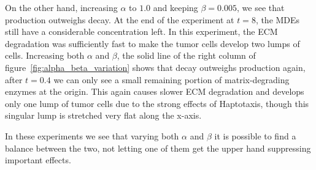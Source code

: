 On the other hand, increasing $\alpha$ to $1.0$ and keeping $\beta=0.005$, we see that production outweighs decay. At the end of the experiment at $t=8$, the MDEs still have a considerable concentration left. In this experiment, the ECM degradation was sufficiently fast to make the tumor cells develop two lumps of cells. Increasing both $\alpha$ and $\beta$, the solid line of the right column of figure~\ref{fig:alpha_beta_variation} shows that decay outweighs production again, after $t=0.4$ we can only see a small remaining portion of matrix-degrading enzymes at the origin. This again causes slower ECM degradation and develops only one lump of tumor cells due to the strong effects of Haptotaxis, though this singular lump is stretched very flat along the x-axis.

In these experiments we see that varying both $\alpha$ and $\beta$ it is possible to find a balance between the two, not letting one of them get the upper hand suppressing important effects.

